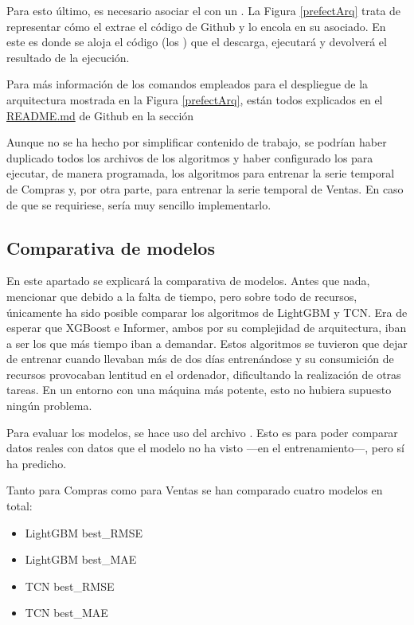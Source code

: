 Para esto último, es necesario asociar el  con un . La Figura \ref{prefectArq} trata de representar cómo el  extrae el código de Github y lo encola en su  asociado. En este  es donde se aloja el código (los ) que el  descarga, ejecutará y devolverá el resultado de la ejecución. 

Para más información de los comandos empleados para el despliegue de la arquitectura mostrada en la Figura \ref{prefectArq}, están todos explicados en el \href{https://github.com/JCOQUE/TFG-ingenieria/blob/main/README.md}{README.md} de Github en la sección 



\begin{nota}
Aunque no se ha hecho por simplificar contenido de trabajo, se podrían haber duplicado todos los archivos  de los algoritmos y haber configurado los  para ejecutar, de manera programada, los algoritmos para entrenar la serie temporal de Compras y, por otra parte, para entrenar la serie temporal de Ventas. En caso de que se requiriese, sería muy sencillo implementarlo.
\end{nota}

\subsection{Comparativa de modelos}
En este apartado se explicará la comparativa de modelos. Antes que nada, mencionar que debido a la falta de tiempo, pero sobre todo de recursos, únicamente ha sido posible comparar los algoritmos de LightGBM y TCN. Era de esperar que XGBoost e Informer,  ambos por su complejidad de arquitectura, iban a ser los que más tiempo iban a demandar. Estos algoritmos se tuvieron que dejar de entrenar cuando llevaban más de dos días entrenándose y su consumición de recursos provocaban lentitud en el ordenador, dificultando la realización de otras tareas. En un entorno con una máquina más potente, esto no hubiera supuesto ningún problema.

Para evaluar los modelos, se hace uso del archivo . Esto es para poder comparar datos reales con datos que el modelo no ha visto ---en el entrenamiento---, pero sí ha predicho.

Tanto para Compras como para Ventas se han comparado cuatro modelos en total: 
\begin{itemize}
	\item LightGBM best\_RMSE
    \item LightGBM best\_MAE
    \item TCN best\_RMSE
    \item TCN best\_MAE
\end{itemize}

